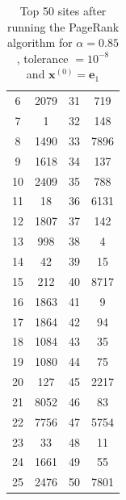 \documentclass{article}
\begin{document}
\begin{enumerate}
\begin{enumerate}
\begin{table}[h!]
\begin{tabular}{|c|c|c|c|}
				6 & 2079 & 31 & 719\\ 
				7 & 1 & 32 & 148\\ 
				8 & 1490 & 33 & 7896\\ 
				9 & 1618 & 34 & 137\\ 
				10 & 2409 & 35 & 788\\ 
				11 & 18 & 36 & 6131\\ 
				12 & 1807 & 37 & 142\\ 
				13 & 998 & 38 & 4\\ 
				14 & 42 & 39 & 15\\ 
				15 & 212 & 40 & 8717\\ 
				16 & 1863 & 41 & 9\\ 
				17 & 1864 & 42 & 94\\ 
				18 & 1084 & 43 & 35\\ 
				19 & 1080 & 44 & 75\\ 
				20 & 127 & 45 & 2217\\ 
				21 & 8052 & 46 & 83\\ 
				22 & 7756 & 47 & 5754\\ 
				23 & 33 & 48 & 11\\ 
				24 & 1661 & 49 & 55\\ 
				25 & 2476 & 50 & 7801 \\
				\hline
			\end{tabular}
			\caption{Top 50 sites after running the PageRank algorithm for $\alpha = 0.85$, tolerance $= 10^{-8}$ and $\textbf{x}^{(0)} = \textbf{e}_1$}
			\end{table}
			

\end{enumerate}
\end{enumerate}
\end{document}
